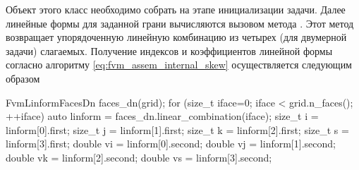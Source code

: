 Объект этого класс необходимо собрать на этапе инициализации задачи.
Далее линейные формы для заданной грани вычисляются вызовом метода
.
Этот метод возвращает упорядоченную линейную комбинацию
из четырех (для двумерной задачи) слагаемых.
Получение индексов и коэффициентов линейной формы согласно алгоритму
\cref{eq:fvm_assem_internal_skew} осуществляется следующим образом
\begin{cppcode}
FvmLinformFacesDn faces_dn(grid);
for (size_t iface=0; iface < grid.n_faces(); ++iface){
	auto linform = faces_dn.linear_combination(iface);
	size_t i = linform[0].first;
	size_t j = linform[1].first;
	size_t k = linform[2].first;
	size_t s = linform[3].first;
	double vi = linform[0].second;
	double vj = linform[1].second;
	double vk = linform[2].second;
	double vs = linform[3].second;
}
\end{cppcode}


